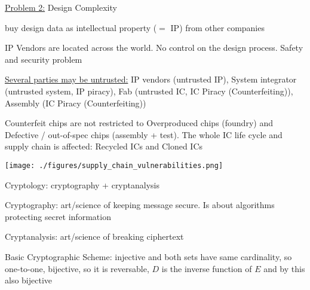 \documentclass[landscape, a4paper]{article}
\begin{document}
\begin{minipage}[t]{0.198\pagewidth}
\begin{betterlist}
\begin{betterlist}
		\end{betterlist}
		\item \underline{Problem 2:} Design Complexity
		\begin{betterlist}
			\item buy design data as \alert{intellectual property} ($=$ \alert{IP}) from other companies
			\item \alert{IP Vendors} are located across the world. No control on the design process. Safety and security problem
		\end{betterlist}
		\item \underline{Several parties may be untrusted:} IP vendors (untrusted IP), System integrator (untrusted system, IP piracy), Fab (untrusted IC, IC Piracy (Counterfeiting)), Assembly (IC Piracy (Counterfeiting))
		\item  \alert{Counterfeit} chips are not restricted to Overproduced chips (foundry) and Defective / out-of-spec chips (assembly + test). The whole IC life cycle and supply chain is affected: \alert{Recycled ICs} and \alert{Cloned ICs}
	\end{betterlist}
	\texttt{[image: ./figures/supply\_chain\_vulnerabilities.png]}
	\begin{betterlist}
		\item \alert{Cryptology:} cryptography + cryptanalysis
		\item \alert{Cryptography:} art/science of keeping message secure. Is about algorithms protecting secret information
		\item \alert{Cryptanalysis:} art/science of breaking ciphertext
		\item \alert{Basic Cryptographic Scheme:} \alert{injective} and both sets have \alert{same cardinality}, so \alert{one-to-one}, \alert{bijective}, so it is \alert{reversable}, $D$ is the \alert{inverse function} of $E$ and by this also bijective
	\end{betterlist}
\end{minipage}
\end{document}
